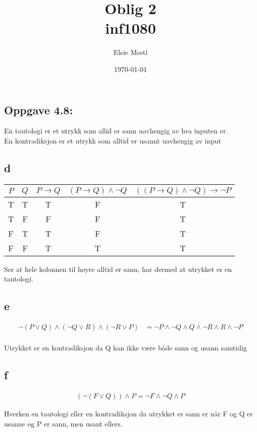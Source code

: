 \documentclass[a4paper, norsk, 10pt]{article}
\date{\today}
\title{Oblig 2 \\ inf1080}
\author{Elsie Mestl}
\begin{document}
\maketitle
\begin{flushleft}
\section*{Oppgave 4.8:}
En tautologi er et utrykk som allid er sann uavhengig av hva inputen er. \\
En kontradiksjon er et utrykk som alltid er usannt uavhengig av input

\subsection*{d}
\begin{table}[h!]
\begin{tabular}{c c || c c c }
$P$ & $Q$ & $P \rightarrow Q$ & $(P \rightarrow Q) \land \neg Q$ & $((P \rightarrow Q) \land \neg Q) \rightarrow \neg P$ \\
\hline
T & T & T & F & T \\
T & F & F & F & T \\
F & T & T & F & T \\
F & F & T & T & T 
\end{tabular}
\end{table}
Ser at hele kolonnen til høyre alltid er sann, har dermed at utrykket er en tautologi.

\subsection*{e}
\begin{align*}
\neg (P  \lor Q) \land (\neg Q \lor R ) \land (\neg R \lor P) &= \neg P \land \neg Q \land  Q \land \neg R \land R \land \neg P \\
\end{align*}

Utrykket er en kontradiksjon da Q kan ikke være både sann og usann samtidig

\subsection*{f}
\begin{align*}
(\neg (F \lor Q)) \land P = \neg F \land \neg Q \land P 
\end{align*}

Hverken en tautologi eller en kontradiksjon da utrykket er sann er når F og Q er usanne og P er sann, men usant ellers.


\end{flushleft}
\end{document}
